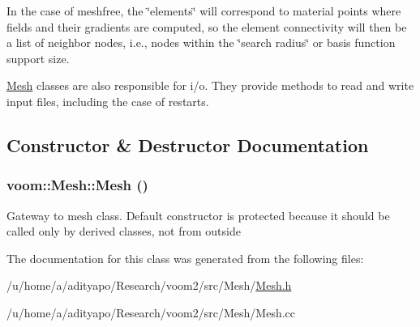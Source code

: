In the case of meshfree, the \char`\"{}elements\char`\"{} will correspond to material points where fields and their gradients are computed, so the element connectivity will then be a list of neighbor nodes, i.e., nodes within the \char`\"{}search radius\char`\"{} or basis function support size.

\hyperlink{classvoom_1_1_mesh}{Mesh} classes are also responsible for i/o. They provide methods to read and write input files, including the case of restarts. 

\subsection{Constructor \& Destructor Documentation}
\hypertarget{classvoom_1_1_mesh_a6bb4b6118d3eeffcbea587aa8c533ac0}{
\subsubsection[{Mesh}]{\setlength{\rightskip}{0pt plus 5cm}voom::Mesh::Mesh ()}}
\label{classvoom_1_1_mesh_a6bb4b6118d3eeffcbea587aa8c533ac0}


Gateway to mesh class. Default constructor is protected because it should be called only by derived classes, not from outside 

The documentation for this class was generated from the following files:\begin{DoxyCompactItemize}
\item 
/u/home/a/adityapo/Research/voom2/src/Mesh/\hyperlink{_mesh_8h}{Mesh.h}\item 
/u/home/a/adityapo/Research/voom2/src/Mesh/Mesh.cc\end{DoxyCompactItemize}
